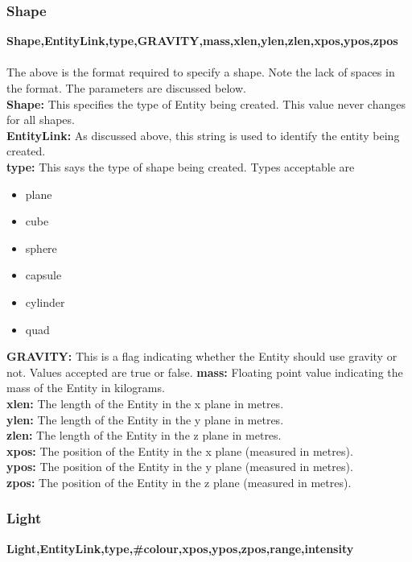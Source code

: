 \documentclass[a4paper,12pt]{article}
\begin{document}
\subsubsection{Shape}

\textbf{Shape,EntityLink,type,GRAVITY,mass,xlen,ylen,zlen,xpos,ypos,zpos}\\\\
The above is the format required to specify a shape. Note the lack of spaces in the format. The parameters are discussed below.\\
\textbf{Shape:} This specifies the type of Entity being created. This value never changes for all shapes.\\
\textbf{EntityLink:} As discussed above, this string is used to identify the entity being created.\\
\textbf{type:} This says the type of shape being created. Types acceptable are 
\begin{itemize}
\item plane
\item cube
\item sphere
\item capsule
\item cylinder
\item quad
\end{itemize}
\textbf{GRAVITY:} This is a flag indicating whether the Entity should use gravity or not. Values accepted are true or false.
\newline
\textbf{mass:} Floating point value indicating the mass of the Entity in kilograms.\\
\textbf{xlen:} The length of the Entity in the x plane in metres.\\
\textbf{ylen:} The length of the Entity in the y plane in metres.\\
\textbf{zlen:} The length of the Entity in the z plane in metres.\\
\textbf{xpos:} The position of the Entity in the x plane (measured in metres).\\
\textbf{ypos:} The position of the Entity in the y plane (measured in metres).\\
\textbf{zpos:} The position of the Entity in the z plane (measured in metres).\\

\subsubsection{Light}

\textbf{Light,EntityLink,type,\#colour,xpos,ypos,zpos,range,intensity}\\\\
\end{document}
